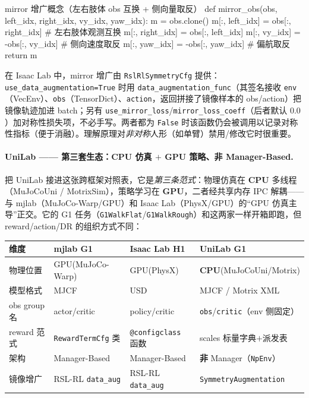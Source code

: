 \begin{codebox}[Python]{mirror 增广概念（左右肢体 obs 互换 + 侧向量取反）}
def mirror_obs(obs, left_idx, right_idx, vy_idx, yaw_idx):
    m = obs.clone()
    m[:, left_idx]  = obs[:, right_idx]      # 左右肢体观测互换
    m[:, right_idx] = obs[:, left_idx]
    m[:, vy_idx]  = -obs[:, vy_idx]          # 侧向速度取反
    m[:, yaw_idx] = -obs[:, yaw_idx]         # 偏航取反
    return m
\end{codebox}

在 Isaac Lab 中，mirror 增广由 \texttt{RslRlSymmetryCfg} 提供：\texttt{use\_data\_augmentation=True} 时用 \texttt{data\_augmentation\_func}（其签名接收 \texttt{env}（VecEnv）、\texttt{obs}（TensorDict）、\texttt{action}，返回拼接了镜像样本的 obs/action）把镜像轨迹加进 batch；另有 \texttt{use\_mirror\_loss}/\allowbreak\texttt{mirror\_loss\_coeff}（后者默认 $0.0$）加对称性损失项，不必手写。两者都为 \texttt{False} 时该函数仍会被调用以记录对称性指标（便于消融）。理解原理对\emph{非对称}人形（如单臂）禁用/修改它时很重要。

\paragraph{UniLab —— 第三套生态：CPU 仿真 $+$ GPU 策略、非 Manager-Based.}
把 UniLab 接进这张跨框架对照表，它是\emph{第三条范式}：物理仿真在 \textbf{CPU} 多线程（MuJoCoUni / MotrixSim），策略学习在 \textbf{GPU}，二者经共享内存 IPC 解耦——与 mjlab（MuJoCo-Warp/GPU）和 Isaac Lab（PhysX/GPU）的“GPU 仿真主导”正交。它的 G1 任务（\texttt{G1WalkFlat}/\allowbreak\texttt{G1WalkRough}）和这两家一样开箱即跑，但 reward/action/DR 的组织方式不同：

\begin{center}
\small
\begin{tabular}{llll}
\hline
维度 & mjlab G1 & Isaac Lab H1 & UniLab G1 \\
\hline
物理位置 & GPU(MuJoCo-Warp) & GPU(PhysX) & \textbf{CPU}(MuJoCoUni/Motrix) \\
模型格式 & MJCF & USD & MJCF / Motrix XML \\
obs group 名 & actor/critic & policy/critic & \texttt{obs}/\allowbreak\texttt{critic}（env 侧固定） \\
reward 范式 & \texttt{RewardTermCfg} 类 & \texttt{@configclass} 函数 & scales 标量字典$+$派发表 \\
架构 & Manager-Based & Manager-Based & \textbf{非} Manager（\texttt{NpEnv}） \\
镜像增广 & RSL-RL \texttt{data\_aug} & RSL-RL \texttt{data\_aug} & \texttt{SymmetryAugmentation} \\
\hline
\end{tabular}
\end{center}

